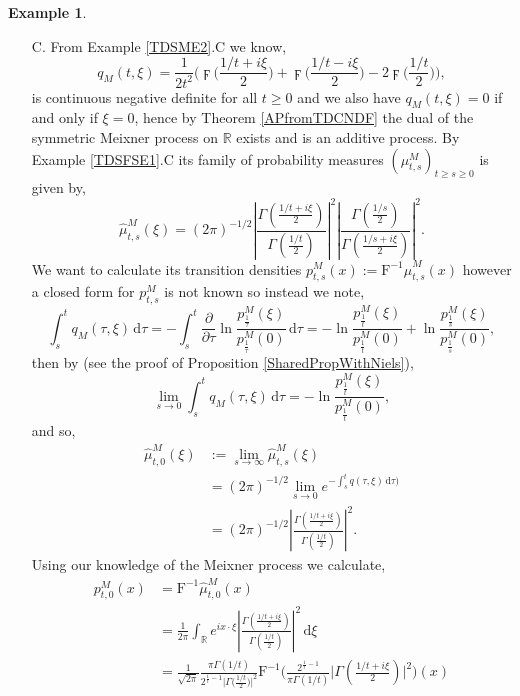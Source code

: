 \documentclass[a4paper, 12pt]{report}
\theoremstyle{cor}
\theoremstyle{remark}
\theoremstyle{definition}
\newtheorem{eg}[theorem]{Example}
\begin{document}
\begin{eg}
\begin{itemize}
\item[C.]  From Example \ref{TDSME2}.C we know,
$$
q_M(t, \xi) = \frac{1}{2t^2}\Bigg(\digamma\bigg(\frac{1/t + i\xi}{2}\bigg) + \digamma\bigg(\frac{1/t - i\xi}{2}\bigg) - 2\digamma\bigg(\frac{1/t}{2}\bigg)\Bigg),
$$
is continuous negative definite for all $t \ge 0$ and we also have $q_M(t, \xi) = 0$ if and only if $\xi = 0$, hence by Theorem \ref{APfromTDCNDF} the dual of the symmetric Meixner process on $\mathbb{R}$ exists and is an additive process.  By Example \ref{TDSFSE1}.C its family of probability measures $(\mu_{t, s}^M)_{t \ge s \ge 0}$ is given by,
$$
\hat{\mu}_{t, s}^M(\xi) = (2\pi)^{-1/2}\left|\frac{\Gamma\left(\frac{1/t + i\xi}{2}\right)}{\Gamma\left(\frac{1/t}{2}\right)}\right|^2 \left|\frac{\Gamma\left(\frac{1/s}{2}\right)}{\Gamma\left(\frac{1/s + i\xi}{2}\right)}\right|^2.
$$
We want to calculate its transition densities $p_{t, s}^M(x) := \mathrm{F}^{-1}\hat{\mu}_{t, s}^M(x)$ however a closed form for $p_{t, s}^M$ is not known so instead we note,
$$
\int_s^tq_M(\tau, \xi)\,\mathrm{d}\tau = -\int_s^t\frac{\partial}{\partial\tau}\ln\frac{p_\frac{1}{\tau}^M(\xi)}{p_\frac{1}{\tau}^M(0)}\,\mathrm{d}\tau = -\ln\frac{p_\frac{1}{t}^M(\xi)}{p_\frac{1}{t}^M(0)} + \ln\frac{p_\frac{1}{s}^M(\xi)}{p_\frac{1}{s}^M(0)},
$$
then by \cite[Theorem 14]{DProofPaper} (see the proof of Proposition \ref{SharedPropWithNiels}),
$$
\lim_{s \to 0}\int_s^tq_M(\tau, \xi)\,\mathrm{d}\tau = -\ln\frac{p_\frac{1}{t}^M(\xi)}{p_\frac{1}{t}^M(0)},
$$
and so,
$$
\begin{aligned}
\hat{\mu}_{t, 0}^M(\xi) & := \lim_{s \to \infty}\hat{\mu}_{t, s}^M(\xi)\\
& = (2\pi)^{-1/2}\lim_{s \to 0}e^{-\int_s^tq(\tau, \xi)\,\mathrm{d}\tau)}\\
& = (2\pi)^{-1/2}\left|\frac{\Gamma\left(\frac{1/t + i\xi}{2}\right)}{\Gamma\left(\frac{1/t}{2}\right)}\right|^2.
\end{aligned}
$$
Using our knowledge of the Meixner process we calculate,
$$
\begin{aligned}
p_{t, 0}^M(x) & = \mathrm{F}^{-1}\hat{\mu}_{t, 0}^M(x)\\
& = \frac{1}{2\pi}\int_{\mathbb{R}}e^{ix\cdot\xi}\left|\frac{\Gamma\left(\frac{1/t + i\xi}{2}\right)}{\Gamma\left(\frac{1/t}{2}\right)}\right|^2\,\mathrm{d}\xi\\
& = \frac{1}{\sqrt{2\pi}}\frac{\pi\Gamma(1/t)}{2^{\frac{1}{t} - 1}\big|\Gamma\big(\frac{1/t}{2}\big)\big|^2}\mathrm{F}^{-1}\Bigg(\frac{2^{\frac{1}{t} - 1}}{\pi\Gamma(1/t)}\bigg|\Gamma\left(\frac{1/t + i\xi}{2}\right)\bigg|^2\Bigg)(x)\\

\end{aligned}$$
\end{itemize}
\end{eg}
\end{document}
